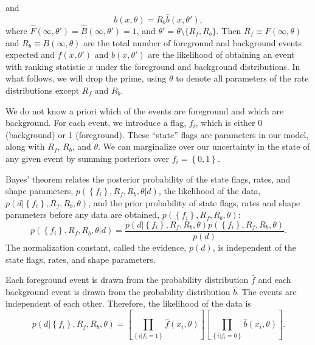 \documentclass[aps,prd]{revtex4-1}
\newcommand{\mathset}[1]{\left\{ #1 \right\}}
\begin{document}
and 
\begin{equation}
  b(x, \theta) = R_b \hat{b}(x, \theta'),
\end{equation}
where $\hat{F}(\infty, \theta') = \hat{B}(\infty, \theta') = 1$, and
$\theta' = \theta \setminus \{R_{f}, R_{b} \}$.  Then $R_f \equiv
  F(\infty,\theta)$ and $R_b \equiv B(\infty,\theta)$ are the
total number of foreground and background events expected and
$\hat{f}(x, \theta')$ and $\hat{b}(x, \theta')$ are the likelihood of
obtaining an event with ranking statistic $x$ under the foreground and
background distributions.  In what follows, we will drop the prime,
using $\theta$ to denote all parameters of the rate distributions
except $R_f$ and $R_b$.

We do not know a priori which of the events are foreground and which
are background.  For each event, we introduce a flag, $f_i$, which is
either 0 (background) or 1 (foreground).  These
``state'' flags are parameters in our model, along with $R_f$, $R_b$,
and $\theta$.  We can marginalize over our uncertainty in the state of
any given event by summing posteriors over $f_i = \mathset{0,1}$.

Bayes' theorem relates the posterior probability of the state flags,
rates, and shape parameters, $p\left(\mathset{f_i}, R_f, R_b, \theta |
  d \right)$, the likelihood of the data, $p\left( d | \mathset{f_i},
  R_f, R_b, \theta\right)$, and the prior probability of state flags,
rates and shape parameters before any data are obtained, $p\left(
  \mathset{f_i}, R_f, R_b, \theta\right)$:
\begin{equation}
  \label{eq:Bayes}
  p\left(\mathset{f_i}, R_f, R_b, \theta | d \right)  =
  \frac{p\left( d | \mathset{f_i}, R_f, R_b, \theta\right)
  p\left(\mathset{f_i}, R_f, R_b, \theta\right)}{p(d)}. 
\end{equation}
The normalization constant, called the evidence, $p(d)$, is
independent of the state flags, rates, and shape parameters.

Each foreground event is drawn from the probability distribution
$\hat{f}$ and each background event is drawn from the probability
distribution $\hat{b}$.  The events are independent of each other.
Therefore, the likelihood of the data is 
\begin{equation}
  p\left( d | \mathset{f_i}, R_f, R_b, \theta\right)  = \left[
    \prod_{\mathset{i | f_i = 1}} \hat{f}\left(x_i, \theta\right) \right]
  \left[ \prod_{\mathset{i | f_i = 0}} \hat{b}\left( x_i, \theta\right)
  \right].  
\end{equation}
\end{document}
